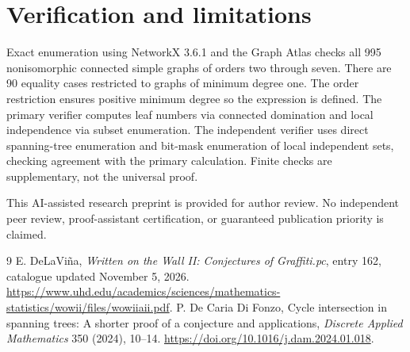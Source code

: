 \documentclass[11pt]{article}
\begin{document}
\section{Verification and limitations}
Exact enumeration using NetworkX 3.6.1 and the Graph Atlas checks all 995 nonisomorphic connected simple graphs of orders two through seven. There are 90 equality cases restricted to graphs of minimum degree one. The order restriction ensures positive minimum degree so the expression is defined. The primary verifier computes leaf numbers via connected domination and local independence via subset enumeration. The independent verifier uses direct spanning-tree enumeration and bit-mask enumeration of local independent sets, checking agreement with the primary calculation. Finite checks are supplementary, not the universal proof.

This AI-assisted research preprint is provided for author review. No independent peer review, proof-assistant certification, or guaranteed publication priority is claimed.
\begin{thebibliography}{9}
 E. DeLaVi\~na, \emph{Written on the Wall II: Conjectures of Graffiti.pc}, entry 162, catalogue updated November 5, 2026. \url{https://www.uhd.edu/academics/sciences/mathematics-statistics/wowii/files/wowiiaii.pdf}.
 P. De Caria Di Fonzo, Cycle intersection in spanning trees: A shorter proof of a conjecture and applications, \emph{Discrete Applied Mathematics} 350 (2024), 10--14. \url{https://doi.org/10.1016/j.dam.2024.01.018}.
\end{thebibliography}
\end{document}
